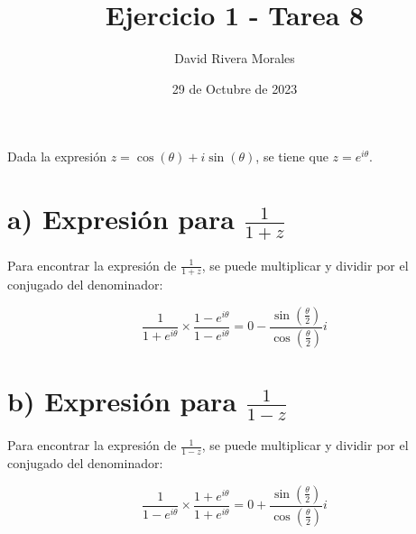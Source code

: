 \documentclass{article}
\title{Ejercicio 1 - Tarea 8}
\author{David Rivera Morales}
\date{29 de Octubre de 2023}
\begin{document}
\maketitle

Dada la expresión \( z = \cos(\theta) + i \sin(\theta) \), se tiene que \( z = e^{i \theta} \).

\section*{a) Expresión para \( \frac{1}{{1 + z}} \)}

Para encontrar la expresión de \( \frac{1}{{1 + z}} \), se puede multiplicar y dividir por el conjugado del denominador:

\[
\frac{1}{{1 + e^{i \theta}}} \times \frac{{1 - e^{i \theta}}}{{1 - e^{i \theta}}} = 0 - \frac{\sin\left(\frac{\theta}{2}\right)}{\cos\left(\frac{\theta}{2}\right)}i
\]

\section*{b) Expresión para \( \frac{1}{{1 - z}} \)}

Para encontrar la expresión de \( \frac{1}{{1 - z}} \), se puede multiplicar y dividir por el conjugado del denominador:

\[
\frac{1}{{1 - e^{i \theta}}} \times \frac{{1 + e^{i \theta}}}{{1 + e^{i \theta}}} = 0 + \frac{\sin\left(\frac{\theta}{2}\right)}{\cos\left(\frac{\theta}{2}\right)}i
\]
\end{document}
